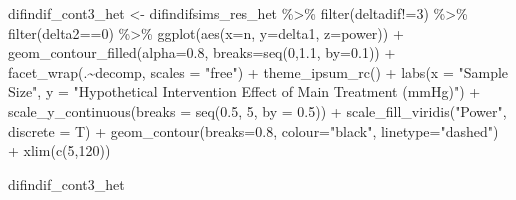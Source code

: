 \documentclass[
]{article}
\newenvironment{Shaded}{\begin{snugshade}}{\end{snugshade}}
\newcommand{\AttributeTok}[1]{\textcolor[rgb]{0.77,0.63,0.00}{#1}}
\newcommand{\DecValTok}[1]{\textcolor[rgb]{0.00,0.00,0.81}{#1}}
\newcommand{\FloatTok}[1]{\textcolor[rgb]{0.00,0.00,0.81}{#1}}
\newcommand{\FunctionTok}[1]{\textcolor[rgb]{0.00,0.00,0.00}{#1}}
\newcommand{\NormalTok}[1]{#1}
\newcommand{\OtherTok}[1]{\textcolor[rgb]{0.56,0.35,0.01}{#1}}
\newcommand{\SpecialCharTok}[1]{\textcolor[rgb]{0.00,0.00,0.00}{#1}}
\newcommand{\StringTok}[1]{\textcolor[rgb]{0.31,0.60,0.02}{#1}}
\begin{document}
\begin{Shaded}
\begin{Highlighting}[]
\NormalTok{difindif\_cont3\_het }\OtherTok{\textless{}{-}}\NormalTok{ difindifsims\_res\_het }\SpecialCharTok{\%\textgreater{}\%} 
  \FunctionTok{filter}\NormalTok{(deltadif}\SpecialCharTok{!=}\DecValTok{3}\NormalTok{) }\SpecialCharTok{\%\textgreater{}\%} 
  \FunctionTok{filter}\NormalTok{(delta2}\SpecialCharTok{==}\DecValTok{0}\NormalTok{) }\SpecialCharTok{\%\textgreater{}\%} 
  \FunctionTok{ggplot}\NormalTok{(}\FunctionTok{aes}\NormalTok{(}\AttributeTok{x=}\NormalTok{n, }\AttributeTok{y=}\NormalTok{delta1, }\AttributeTok{z=}\NormalTok{power)) }\SpecialCharTok{+}
  \FunctionTok{geom\_contour\_filled}\NormalTok{(}\AttributeTok{alpha=}\FloatTok{0.8}\NormalTok{, }\AttributeTok{breaks=}\FunctionTok{seq}\NormalTok{(}\DecValTok{0}\NormalTok{,}\FloatTok{1.1}\NormalTok{, }\AttributeTok{by=}\FloatTok{0.1}\NormalTok{)) }\SpecialCharTok{+}
  \FunctionTok{facet\_wrap}\NormalTok{(.}\SpecialCharTok{\textasciitilde{}}\NormalTok{decomp, }\AttributeTok{scales =} \StringTok{"free"}\NormalTok{) }\SpecialCharTok{+}
  \FunctionTok{theme\_ipsum\_rc}\NormalTok{() }\SpecialCharTok{+}
  \FunctionTok{labs}\NormalTok{(}\AttributeTok{x =} \StringTok{"Sample Size"}\NormalTok{,}
       \AttributeTok{y =} \StringTok{"Hypothetical Intervention Effect of Main Treatment (mmHg)"}\NormalTok{) }\SpecialCharTok{+}
  \FunctionTok{scale\_y\_continuous}\NormalTok{(}\AttributeTok{breaks =} \FunctionTok{seq}\NormalTok{(}\FloatTok{0.5}\NormalTok{, }\DecValTok{5}\NormalTok{, }\AttributeTok{by =} \FloatTok{0.5}\NormalTok{)) }\SpecialCharTok{+}
  \FunctionTok{scale\_fill\_viridis}\NormalTok{(}\StringTok{"Power"}\NormalTok{, }\AttributeTok{discrete =}\NormalTok{ T) }\SpecialCharTok{+}
  \FunctionTok{geom\_contour}\NormalTok{(}\AttributeTok{breaks=}\FloatTok{0.8}\NormalTok{, }\AttributeTok{colour=}\StringTok{"black"}\NormalTok{, }\AttributeTok{linetype=}\StringTok{"dashed"}\NormalTok{) }\SpecialCharTok{+}
  \FunctionTok{xlim}\NormalTok{(}\FunctionTok{c}\NormalTok{(}\DecValTok{5}\NormalTok{,}\DecValTok{120}\NormalTok{))}

\NormalTok{difindif\_cont3\_het}
\end{Highlighting}
\end{Shaded}
\end{document}
